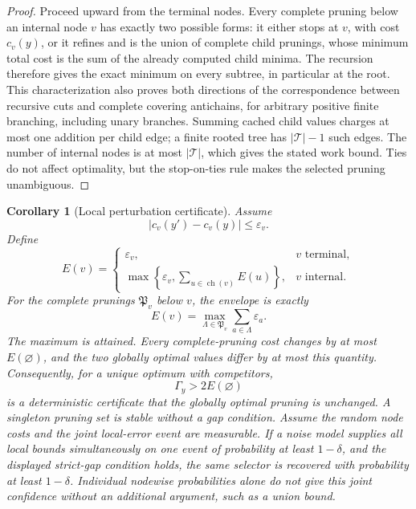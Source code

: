 \documentclass[11pt,a4paper]{article}
\newtheorem{corollary}[theorem]{Corollary}
\theoremstyle{definition}
\theoremstyle{remark}
\begin{document}
\begin{proof}
Proceed upward from the terminal nodes.  Every complete pruning below an internal node $v$ has exactly two possible forms: it either stops at $v$, with cost $c_v(y)$, or it refines and is the union of complete child prunings, whose minimum total cost is the sum of the already computed child minima.  The recursion therefore gives the exact minimum on every subtree, in particular at the root. This characterization also proves both directions of the correspondence between recursive cuts and complete covering antichains, for arbitrary positive finite branching, including unary branches. Summing cached child values charges at most one addition per child edge; a finite rooted tree has $|\mathcal T|-1$ such edges. The number of internal nodes is at most $|\mathcal T|$, which gives the stated work bound. Ties do not affect optimality, but the stop-on-ties rule makes the selected pruning unambiguous.
\end{proof}

\begin{corollary}[Local perturbation certificate]\label{result:16}
Assume
\[
|c_v(y')-c_v(y)|\le\varepsilon_v.
\]
Define
\[
E(v)
=
\begin{cases}
\varepsilon_v,&v\text{ terminal},\\[1mm]
\displaystyle
\max\left\{\varepsilon_v,
\sum_{u\in\operatorname{ch}(v)}E(u)\right\},&v\text{ internal}.
\end{cases}
\]
For the complete prunings $\mathfrak P_v$ below $v$, the envelope is exactly
\[
E(v)=\max_{\Lambda\in\mathfrak P_v}\sum_{a\in\Lambda}\varepsilon_a.
\]
The maximum is attained. Every complete-pruning cost changes by at most $E(\varnothing)$, and the two globally optimal values differ by at most this quantity. Consequently, for a unique optimum with competitors,
\[
\boxed{\Gamma_y>2E(\varnothing)}
\]
is a deterministic certificate that the globally optimal pruning is unchanged.  A singleton pruning set is stable without a gap condition. Assume the random node costs and the joint local-error event are measurable. If a noise model supplies \emph{all} local bounds simultaneously on one event of probability at least $1-\delta$, and the displayed strict-gap condition holds, the same selector is recovered with probability at least $1-\delta$. Individual nodewise probabilities alone do not give this joint confidence without an additional argument, such as a union bound.
\end{corollary}
\end{document}
